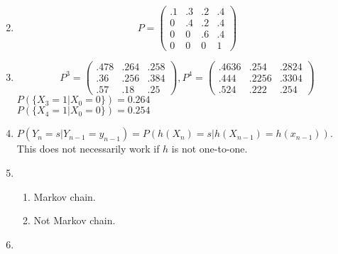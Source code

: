 \documentclass{article}
\begin{document}
\begin{enumerate}
\begin{enumerate}
\begin{displaymath}
			\end{displaymath}
	\end{enumerate}
\item %
	\begin{displaymath}
		P = \left( \begin{array}{cccc}
			.1 & .3 & .2 & .4 \\
			0 & .4 & .2 & .4 \\
			0 & 0 & .6 & .4 \\
			0 & 0 & 0 & 1
		\end{array} \right)
	\end{displaymath}
\item %
	\begin{displaymath}
		P^3 = \left( \begin{array}{ccc}
			.478 & .264 & .258 \\
			.36 & .256 & .384 \\
			.57 & .18 & .25
		\end{array} \right),
		P^4 = \left( \begin{array}{ccc}
			.4636 & .254 & .2824 \\
			.444 & .2256 & .3304 \\
			.524 & .222 & .254
		\end{array} \right)
	\end{displaymath}
	$P(\{X_3 = 1 | X_0 = 0\}) = 0.264$ \\
	$P(\{X_4 = 1 | X_0 = 0\}) = 0.254$
\item %
	$P(Y_n = s | Y_{n-1} = y_{n-1}) = P(h(X_n) = s | h(X_{n-1}) = h(x_{n-1}))$. \\
	This does not necessarily work if $h$ is not one-to-one.
\item %
	\begin{enumerate}
		\item Markov chain.
		\item Not Markov chain.
	\end{enumerate}
\item %
\end{enumerate}
\end{document}
